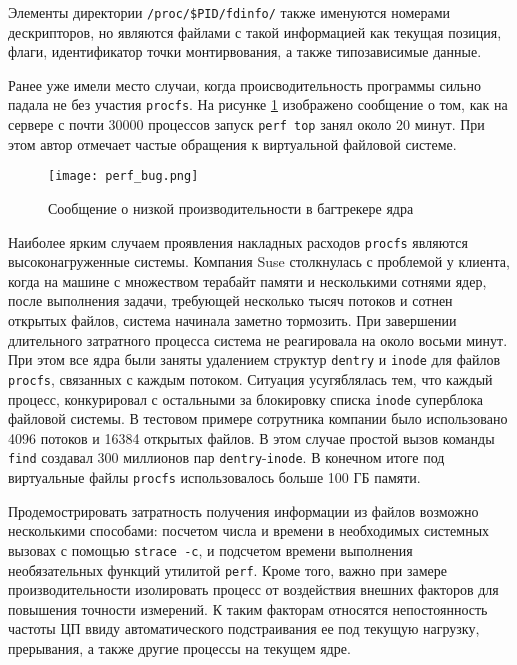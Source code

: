 Элементы директории \texttt{/proc/\$PID/fdinfo/} также именуются номерами
дескрипторов, но являются файлами с такой информацией как текущая позиция,
флаги, идентификатор точки монтирвования, а также типозависимые данные.

Ранее уже имели место случаи, когда происводительность программы сильно падала
не без участия \texttt{procfs}\cite{slowperf}. На рисунке \ref{fig:perf_bug}
изображено сообщение о том, как на сервере с почти 30000 процессов запуск
\texttt{perf top} занял около 20 минут. При этом автор отмечает частые обращения
к виртуальной файловой системе.

\begin{figure}
  \centering
  \texttt{[image: perf\_bug.png]}
  \caption{Сообщение о низкой производительности в багтрекере ядра \cite{slowperf}}
  \label{fig:perf_bug}
\end{figure}

Наиболее ярким случаем проявления накладных расходов \texttt{procfs} являются
высоконагруженные системы. Компания Suse столкнулась с проблемой у клиента,
когда на машине с множеством терабайт памяти и несколькими сотнями ядер, после
выполнения задачи, требующей несколько тысяч потоков и сотнен открытых файлов,
система начинала заметно тормозить\cite{huge_proc_suse}. При завершении
длительного затратного процесса система не реагировала на около восьми минут.
При этом все ядра были заняты удалением структур \texttt{dentry} и
\texttt{inode} для файлов \texttt{procfs}, связанных с каждым потоком. Ситуация
усугяблялась тем, что каждый процесс, конкурировал с остальными за блокировку
списка \texttt{inode} суперблока файловой системы. В тестовом примере сотрутника
компании было использовано 4096 потоков и 16384 открытых файлов. В этом случае
простой вызов команды \texttt{find} создавал 300 миллионов пар
\texttt{dentry}-\texttt{inode}. В конечном итоге под виртуальные файлы
\texttt{procfs} использовалось больше 100 ГБ памяти.

Продемострировать затратность получения информации из файлов возможно несколькими
способами: посчетом числа и времени в необходимых системных вызовах с помощью
\texttt{strace -c}, и подсчетом времени выполнения необязательных функций
утилитой \texttt{perf}. Кроме того, важно при замере производительности
изолировать процесс от воздействия внешних факторов для повышения точности
измерений. К таким факторам относятся непостоянность частоты ЦП ввиду
автоматического подстраивания ее под текущую нагрузку, прерывания, а также
другие процессы на текущем ядре\cite{kernelnewbies}.

